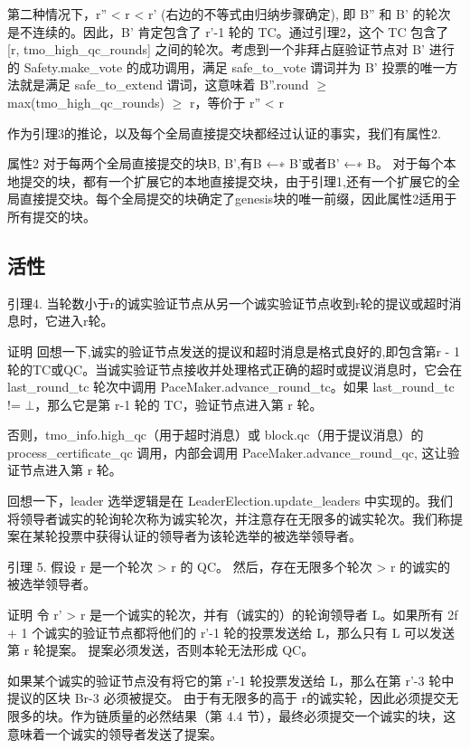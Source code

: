 第二种情况下，r'' < r < r' (右边的不等式由归纳步骤确定), 即 B'' 和 B' 的轮次是不连续的。因此，B' 肯定包含了 r'-1 轮的 TC。通过引理2，这个 TC 包含了 [r, tmo\_high\_qc\_rounds] 之间的轮次。考虑到一个非拜占庭验证节点对 B' 进行的 Safety.make\_vote 的成功调用，满足 safe\_to\_vote 谓词并为 B' 投票的唯一方法就是满足 safe\_to\_extend 谓词，这意味着 B''.round $\geq$ max(tmo\_high\_qc\_rounds) $\geq$ r，等价于 r'' < r

作为引理3的推论，以及每个全局直接提交块都经过认证的事实，我们有属性2. 

属性2 对于每两个全局直接提交的块B, B',有B ←∗ B'或者B' ←∗ B。
对于每个本地提交的块，都有一个扩展它的本地直接提交块，由于引理1,还有一个扩展它的全局直接提交块。每个全局提交的块确定了genesis块的唯一前缀，因此属性2适用于所有提交的块。

\subsection{活性}

引理4. 当轮数小于r的诚实验证节点从另一个诚实验证节点收到r轮的提议或超时消息时，它进入r轮。

证明 回想一下,诚实的验证节点发送的提议和超时消息是格式良好的,即包含第r - 1轮的TC或QC。当诚实验证节点接收并处理格式正确的超时或提议消息时，它会在 last\_round\_tc 轮次中调用 PaceMaker.advance\_round\_tc。如果 last\_round\_tc != $\bot$，那么它是第 r-1 轮的 TC，验证节点进入第 r 轮。

否则，tmo\_info.high\_qc（用于超时消息）或 block.qc（用于提议消息）的 process\_certificate\_qc 调用，内部会调用 PaceMaker.advance\_round\_qc, 这让验证节点进入第 r 轮。

回想一下，leader 选举逻辑是在 LeaderElection.update\_leaders 中实现的。我们将领导者诚实的轮询轮次称为诚实轮次，并注意存在无限多的诚实轮次。我们称提案在某轮投票中获得认证的领导者为该轮选举的被选举领导者。

引理 5. 假设 r 是一个轮次 > r 的 QC。 然后，存在无限多个轮次 > r 的诚实的被选举领导者。

证明  令 r' > r 是一个诚实的轮次，并有（诚实的）的轮询领导者 L。如果所有 2f + 1 个诚实的验证节点都将他们的 r'-1 轮的投票发送给 L，那么只有 L 可以发送第 r 轮提案。 提案必须发送，否则本轮无法形成 QC。

如果某个诚实的验证节点没有将它的第 r'-1 轮投票发送给 L，那么在第 r'-3 轮中提议的区块 Br-3 必须被提交。 由于有无限多的高于 r的诚实轮，因此必须提交无限多的块。作为链质量的必然结果（第 4.4 节），最终必须提交一个诚实的块，这意味着一个诚实的领导者发送了提案。

